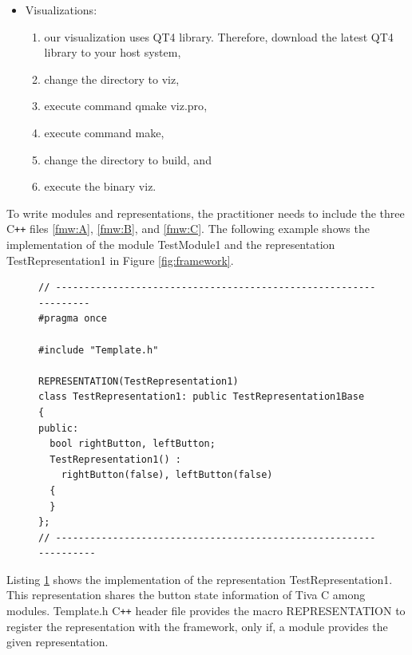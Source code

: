 \documentclass{llncs}
\begin{document}
\begin{sloppy}
\begin{itemize}
\item Visualizations:
\begin{enumerate}
\item our visualization uses QT4 library. Therefore, download the latest QT4 library to your host
system,
\item change the directory to {\sf viz},
\item execute command {\sf qmake viz.pro},
\item execute command {\sf make},
\item change the directory to {\sf build}, and 
\item execute the binary {\sf viz}.
\end{enumerate}

\end{itemize}


To write modules and representations, the practitioner needs to include the three C\texttt{++}
files \ref{fmw:A}, \ref{fmw:B}, and \ref{fmw:C}. The following example shows the implementation
of the module {\sf TestModule1} and the representation {\sf TestRepresentation1} in Figure
\ref{fig:framework}.

\begin{figure}[!ht]
\begin{center}
\begin{verbatim}
// -----------------------------------------------------------------
#pragma once

#include "Template.h"

REPRESENTATION(TestRepresentation1)
class TestRepresentation1: public TestRepresentation1Base
{
public:
  bool rightButton, leftButton;
  TestRepresentation1() :
    rightButton(false), leftButton(false)
  {
  }
};
// ------------------------------------------------------------------
\end{verbatim}
\end{center}
\label{list:TestRepresentation1.h}
\end{figure}

Listing \ref{list:TestRepresentation1.h} shows the implementation of the representation {\sf
TestRepresentation1}. This representation shares the button state information of Tiva C among
modules. {\sf Template.h} C\texttt{++} header file provides the macro {\sf REPRESENTATION} to
register the representation with the framework, only if, a module provides the given
representation. 


\end{sloppy}
\end{document}
